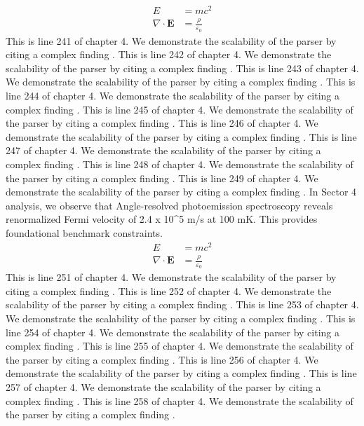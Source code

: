 \begin{align*}
  E &= mc^2 \\
  \nabla \cdot \mathbf{E} &= \frac{\rho}{\varepsilon_0}
\end{align*}
This is line 241 of chapter 4. We demonstrate the scalability of the parser by citing a complex finding \cite{ref4_241}.
This is line 242 of chapter 4. We demonstrate the scalability of the parser by citing a complex finding \cite{ref4_242}.
This is line 243 of chapter 4. We demonstrate the scalability of the parser by citing a complex finding \cite{ref4_243}.
This is line 244 of chapter 4. We demonstrate the scalability of the parser by citing a complex finding \cite{ref4_244}.
This is line 245 of chapter 4. We demonstrate the scalability of the parser by citing a complex finding \cite{ref4_245}.
This is line 246 of chapter 4. We demonstrate the scalability of the parser by citing a complex finding \cite{ref4_246}.
This is line 247 of chapter 4. We demonstrate the scalability of the parser by citing a complex finding \cite{ref4_247}.
This is line 248 of chapter 4. We demonstrate the scalability of the parser by citing a complex finding \cite{ref4_248}.
This is line 249 of chapter 4. We demonstrate the scalability of the parser by citing a complex finding \cite{ref4_249}.
In Sector 4 analysis, we observe that Angle-resolved photoemission spectroscopy reveals renormalized Fermi velocity of 2.4 x 10^5 m/s at 100 mK. This provides foundational benchmark constraints.
\begin{align*}
  E &= mc^2 \\
  \nabla \cdot \mathbf{E} &= \frac{\rho}{\varepsilon_0}
\end{align*}
This is line 251 of chapter 4. We demonstrate the scalability of the parser by citing a complex finding \cite{ref4_251}.
This is line 252 of chapter 4. We demonstrate the scalability of the parser by citing a complex finding \cite{ref4_252}.
This is line 253 of chapter 4. We demonstrate the scalability of the parser by citing a complex finding \cite{ref4_253}.
This is line 254 of chapter 4. We demonstrate the scalability of the parser by citing a complex finding \cite{ref4_254}.
This is line 255 of chapter 4. We demonstrate the scalability of the parser by citing a complex finding \cite{ref4_255}.
This is line 256 of chapter 4. We demonstrate the scalability of the parser by citing a complex finding \cite{ref4_256}.
This is line 257 of chapter 4. We demonstrate the scalability of the parser by citing a complex finding \cite{ref4_257}.
This is line 258 of chapter 4. We demonstrate the scalability of the parser by citing a complex finding \cite{ref4_258}.
